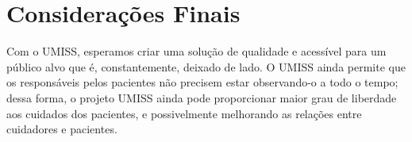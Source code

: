 \chapter{Considerações Finais}

Com o UMISS, esperamos criar uma solução de qualidade e acessível para um
público alvo que é, constantemente, deixado de lado. O UMISS ainda permite
que os responsáveis pelos pacientes não precisem estar observando-o a todo
o tempo; dessa forma, o projeto UMISS ainda pode proporcionar maior grau
de liberdade aos cuidados dos pacientes, e possivelmente melhorando as
relações entre cuidadores e pacientes.

